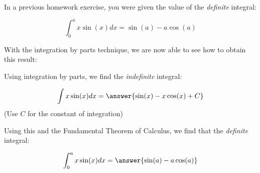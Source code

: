 \documentclass{ximera}
\author{Jim Talamo}
\begin{document}
\begin{exercise}
In a previous homework exercise, you were given the value of the \emph{definite} integral:

\[
\int_0^a x \sin(x) dx = \sin(a)-a \cos(a)
\]

With the integration by parts technique, we are now able to see how to obtain this result:

Using integration by parts, we find the \emph{indefinite} integral:

\[
\int x \sin(x) dx = \answer{\sin(x)-x \cos(x)+C}
\]
(Use $C$ for the constant of integration)

Using this and the Fundamental Theorem of Calculus, we find that the \emph{definite} integral:

\[
\int_0^a x \sin(x) dx = \answer{\sin(a)-a \cos(a)}
\]

\end{exercise}
\end{document}
